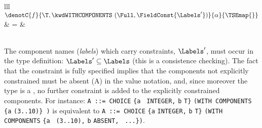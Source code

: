 \noindent
\begin{tabular}{lll}
    $\denotC{f}{\T, \kwdWITHCOMPONENTS \,\, (\Full,
     \FieldConst{\Labels'})}{\alpha}{\TSEmap{}}$
  & \hspace*{-4mm} = &\\
    \\
\end{tabular}%

\medskip

The component names (\emph{labels}) which carry constraints,
$\Labels'$, must occur in the type definition: $\Labels' \subseteq
\Labels$ (this is a consistence checking). The fact that the
constraint is fully specified implies that the components not
explicitly constrained must be absent (A) in the value notation,
and, since moreover the type is a \kwdCHOICE, no further constraint is
added to the explicitly constrained components. For instance:
\texttt{\small A ::= CHOICE} \verb+{+\texttt{a} \texttt{\small
INTEGER,} \texttt{b} \texttt{\small T}\verb+}+ \texttt{\small (WITH
COMPONENTS} \verb+{+\texttt{a} \texttt{(3..10)}\verb+}+\texttt{\small
)} is equivalent to \texttt{\small A ::= CHOICE} \verb+{+\texttt{a}
\texttt{\small INTEGER,} \texttt{b} \texttt{\small T}\verb+}+
\texttt{\small (WITH COMPONENTS} \verb+{+\texttt{a} \texttt{\small
(3..10),} \texttt{b} \texttt{\small ABSENT,} \texttt{\small
...}\verb+}+\texttt{\small )}.

